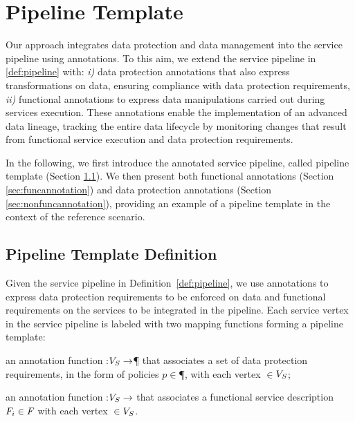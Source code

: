 \section{Pipeline Template}\label{sec:template}
Our approach integrates data protection and data management into the service pipeline using annotations.
To this aim, we extend the service pipeline in \cref{def:pipeline} with: \emph{i)} data protection annotations that also express transformations on data, ensuring compliance with data protection requirements, \emph{ii)} functional annotations to express data manipulations carried out during services execution.
These annotations enable the implementation of an advanced data lineage, tracking the entire data lifecycle by monitoring changes that result from functional service execution and data protection requirements.

In the following, we first introduce the annotated service pipeline, called pipeline template (Section \ref{sec:templatedefinition}). We then present both functional annotations (Section \ref{sec:funcannotation}) and data protection annotations (Section \ref{sec:nonfuncannotation}), providing an example of a pipeline template in the context of the reference scenario.

\subsection{Pipeline Template Definition}\label{sec:templatedefinition}
Given the service pipeline in Definition~\ref{def:pipeline}, we use annotations to express data protection requirements to be enforced on data and functional requirements on the services to be integrated in the pipeline. Each service vertex in the service pipeline is labeled with two mapping functions forming a pipeline template:
\begin{enumerate*}[label=\textit{\roman*})]
  \item an annotation function \myLambda:$V_S\rightarrow$\P{} that associates a set of data protection requirements, in the form of policies $p$$\in$\P{}, with each vertex $\in$$V_S$;
  \item an annotation function \myGamma:$V_S\rightarrow$\F{} that associates a functional service description $F_i\in F_{}$ with each vertex $\in$$V_S$.
\end{enumerate*}

